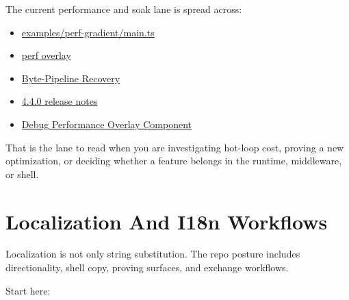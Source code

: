 The current performance and soak lane is spread across:

\begin{itemize}
\tightlist
\item
  \href{https://github.com/flyingrobots/bijou/blob/cbd70612140e7a450d764b3c7be1c6af878b99bc/examples/perf-gradient/main.ts}{examples/perf-gradient/main.ts}
\item
  \href{https://github.com/flyingrobots/bijou/blob/cbd70612140e7a450d764b3c7be1c6af878b99bc/packages/bijou/src/core/components/perf-overlay.ts}{perf overlay}
\item
  \href{https://github.com/flyingrobots/bijou/blob/cbd70612140e7a450d764b3c7be1c6af878b99bc/docs/perf/RE-017-byte-pipeline.md}{Byte-Pipeline Recovery}
\item
  \href{https://github.com/flyingrobots/bijou/blob/cbd70612140e7a450d764b3c7be1c6af878b99bc/docs/releases/4.4.0/whats-new.md}{4.4.0 release notes}
\item
  \href{https://github.com/flyingrobots/bijou/blob/cbd70612140e7a450d764b3c7be1c6af878b99bc/docs/BACKLOG/cool-ideas/DX-006-debug-performance-overlay-component.md}{Debug Performance Overlay Component}
\end{itemize}

That is the lane to read when you are investigating hot-loop cost, proving a new optimization, or deciding whether a feature belongs in the runtime, middleware, or shell.

\section{Localization And I18n Workflows}\label{record-001-localization-and-i18n-workflows}

Localization is not only string substitution. The repo posture includes directionality, shell copy, proving surfaces, and exchange workflows.

Start here:

